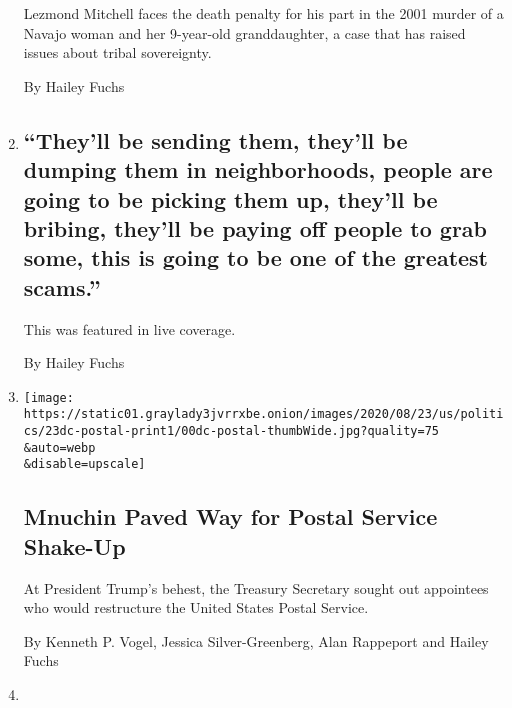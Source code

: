 \begin{enumerate}
  Lezmond Mitchell faces the death penalty for his part in the 2001
  murder of a Navajo woman and her 9-year-old granddaughter, a case that
  has raised issues about tribal sovereignty.

  By Hailey Fuchs
\item
  \href{/live/2020/08/24/us/rnc-fact-check/theyll-be-sending-them-theyll-be-dumping-them-in-neighborhoods-people-are-going-to-be-picking-them-up-theyll-be-bribing-theyll-b}{}

  \hypertarget{theyll-be-sending-them-theyll-be-dumping-them-in-neighborhoods-people-are-going-to-be-picking-them-up-theyll-be-bribing-theyll-be-paying-off-people-to-grab-some-this-is-going-to-be-one-of-the-greatest-scams}{%
  \subsection{``They'll be sending them, they'll be dumping them in
  neighborhoods, people are going to be picking them up, they'll be
  bribing, they'll be paying off people to grab some, this is going to
  be one of the greatest
  scams.''}\label{theyll-be-sending-them-theyll-be-dumping-them-in-neighborhoods-people-are-going-to-be-picking-them-up-theyll-be-bribing-theyll-be-paying-off-people-to-grab-some-this-is-going-to-be-one-of-the-greatest-scams}}

  This was featured in live coverage.

  By Hailey Fuchs
\item
  \href{/2020/08/22/business/economy/dejoy-postmaster-general-trump-mnuchin.html}{}

  \texttt{[image: https://static01.graylady3jvrrxbe.onion/images/2020/08/23/us/politics/23dc-postal-print1/00dc-postal-thumbWide.jpg?quality=75\\\&auto=webp\\\&disable=upscale]}

  \hypertarget{mnuchin-paved-way-for-postal-service-shake-up}{%
  \subsection{Mnuchin Paved Way for Postal Service
  Shake-Up}\label{mnuchin-paved-way-for-postal-service-shake-up}}

  At President Trump's behest, the Treasury Secretary sought out
  appointees who would restructure the United States Postal Service.

  By Kenneth P. Vogel, Jessica Silver-Greenberg, Alan Rappeport and
  Hailey Fuchs
\item
  \href{/2020/08/21/us/elections/states-file-a-joint-lawsuit-over-changes-to-post-office-operations.html}{}


\end{enumerate}
